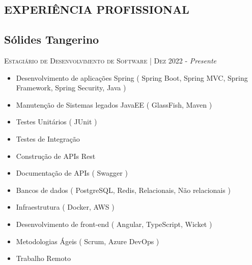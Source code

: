 
\begin{framed}
  \section{EXPERIÊNCIA PROFISSIONAL}

  \subsection{  Sólides Tangerino}

  \textsc{Estagiário de Desenvolvimento de Software} | \textsc{Dez 2022} - \emph{Presente}
  \begin{itemize}[leftmargin=*]
    \item Desenvolvimento de aplicações Spring ( Spring Boot, Spring MVC, Spring Framework, Spring Security, Java )
    \item Manutenção de Sistemas legados JavaEE ( GlassFish, Maven )
    \item Testes Unitários ( JUnit )
    \item Testes de Integração
    \item Construção de APIs Rest
    \item Documentação de APIs ( Swagger )
    \item Bancos de dados ( PostgreSQL, Redis, Relacionais, Não relacionais )
    \item Infraestrutura ( Docker, AWS )
    \item Desenvolvimento de front-end ( Angular, TypeScript, Wicket )
    \item Metodologias Ágeis ( Scrum, Azure DevOps )
    \item Trabalho Remoto
  \end{itemize}


\end{framed}